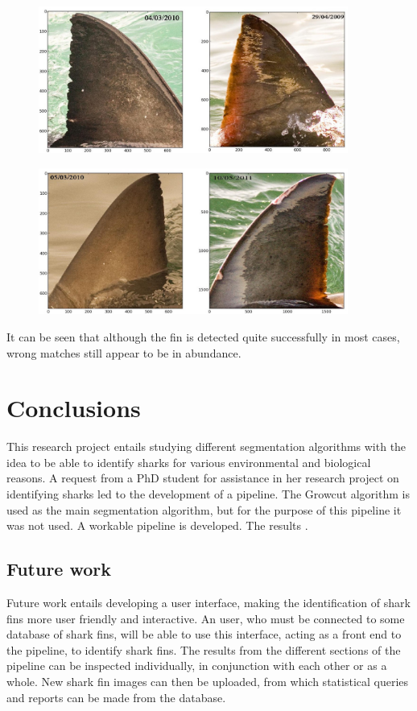 \documentclass[a4paper,10pt]{article}
\begin{document}
\begin{figure}[H]
\centering
\includegraphics[width=4in]{sharkmatch2.jpg} 
\label{fig7}
\end{figure}

\begin{figure}[H]
\centering
\includegraphics[width=4in]{sharkmatch3.jpg} 
\label{fig7}
\end{figure}


It can be seen that although the fin is detected quite successfully in most cases, wrong matches still appear to be in abundance. \\

\newpage
\section{Conclusions}
This research project entails studying different segmentation algorithms with the idea to be able to identify sharks for various environmental and biological reasons.
A request from a PhD student for assistance in her research project on identifying sharks led to the development of a pipeline. The Growcut algorithm is used as the main segmentation algorithm, but for the purpose of this pipeline it was not used.  A workable pipeline is developed.  The results . \\

\subsection{Future work}
Future work entails developing a user
interface, making the identification of shark fins more user friendly and interactive.
An user, who must be connected to some database of shark fins, will be able to
use this interface, acting as a front end to the
  pipeline, to identify shark fins.  The
results from the different sections of the pipeline can be
  inspected individually, in
conjunction with each other or as a whole.  New shark fin images can then be
uploaded, from which statistical queries and reports can be
made from the database. \\
\end{document}
